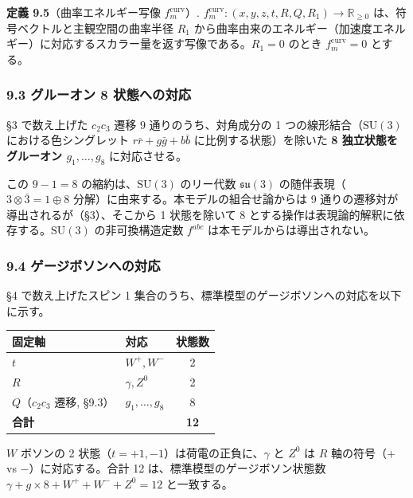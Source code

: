 \documentclass[
  a4paper,11pt]{ltjsarticle}
\newcounter{none}
\theoremstyle{definition}
\theoremstyle{remark}
\begin{document}
\textbf{定義 9.5}（曲率エネルギー写像 \(f_m^{\text{curv}}\)）.
\(f_m^{\text{curv}}: (x, y, z, t, R, Q, R_1) \to \mathbb{R}_{\geq 0}\)
は、符号ベクトルと主観空間の曲率半径 \(R_1\)
から曲率由来のエネルギー（加速度エネルギー）に対応するスカラー量を返す写像である。\(R_1 = 0\)
のとき \(f_m^{\text{curv}} = 0\) とする。

\subsubsection{9.3 グルーオン 8
状態への対応}\label{ux30b0ux30ebux30fcux30aaux30f3-8-ux72b6ux614bux3078ux306eux5bfeux5fdc}

§3 で数え上げた \(c_2 c_3\) 遷移 9 通りのうち、対角成分の 1
つの線形結合（\(\mathrm{SU}(3)\) における色シングレット
\(r\bar{r} + g\bar{g} + b\bar{b}\) に比例する状態）を除いた \textbf{8
独立状態をグルーオン \(g_1, \ldots, g_8\)} に対応させる。

この \(9 - 1 = 8\) の縮約は、\(\mathrm{SU}(3)\) のリー代数
\(\mathfrak{su}(3)\) の随伴表現（\(3 \otimes \bar{3} = 1 \oplus 8\)
分解）に由来する。本モデルの組合せ論からは 9
通りの遷移対が導出されるが（§3）、そこから 1 状態を除いて 8
とする操作は表現論的解釈に依存する。\(\mathrm{SU}(3)\) の非可換構造定数
\(f^{abc}\) は本モデルからは導出されない。

\subsubsection{9.4
ゲージボソンへの対応}\label{ux30b2ux30fcux30b8ux30dcux30bdux30f3ux3078ux306eux5bfeux5fdc}

§4 で数え上げたスピン 1
集合のうち、標準模型のゲージボソンへの対応を以下に示す。

{\def\LTcaptype{none} %
\begin{longtable}[]{@{}llc@{}}
\toprule\noalign{}
固定軸 & 対応 & 状態数 \\
\midrule\noalign{}
\endhead
\bottomrule\noalign{}
\endlastfoot
\(t\) & \(W^+, W^-\) & 2 \\
\(R\) & \(\gamma, Z^0\) & 2 \\
\(Q\)（\(c_2 c_3\) 遷移, §9.3） & \(g_1, \ldots, g_8\) & 8 \\
\textbf{合計} & & \textbf{12} \\
\end{longtable}
}

\(W\) ボソンの 2 状態（\(t = +1, -1\)）は荷電の正負に、\(\gamma\) と
\(Z^0\) は \(R\) 軸の符号（\(+\) vs \(-\)）に対応する。合計 12
は、標準模型のゲージボソン状態数
\(\gamma + g \times 8 + W^+ + W^- + Z^0 = 12\) と一致する。
\end{document}
